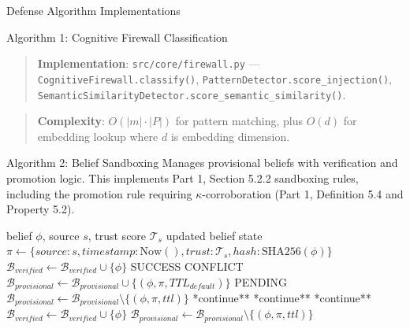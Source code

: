 \documentclass[
  ignorenonframetext,
]{beamer}
\begin{document}
\begin{frame}[fragile]{Defense Algorithm Implementations}
\begin{block}{Algorithm 1: Cognitive Firewall Classification}
\begin{quote}
\textbf{Implementation}: \texttt{src/core/firewall.py} ---
\texttt{CognitiveFirewall.classify()},
\texttt{PatternDetector.score\_injection()},
\texttt{SemanticSimilarityDetector.score\_semantic\_similarity()}.
\end{quote}

\begin{quote}
\textbf{Complexity}: \(O(|m| \cdot |P|)\) for pattern matching, plus
\(O(d)\) for embedding lookup where \(d\) is embedding dimension.
\end{quote}
\end{block}

\begin{block}{Algorithm 2: Belief Sandboxing}
\protect{}\label{sec:alg-sandbox}
Manages provisional beliefs with verification and promotion logic. This
implements Part 1, Section 5.2.2 sandboxing rules, including the
promotion rule requiring \(\kappa\)-corroboration (Part 1, Definition
5.4 and Property 5.2).

\begin{algorithm}
\caption{Belief Sandbox Operations}
\label{alg:sandbox-impl}
\begin{algorithmic}[1]
\Require belief $\phi$, source $s$, trust score $\mathcal{T}_s$
\Ensure updated belief state
  \State $\pi \gets \{source: s, timestamp: \text{Now}(), trust: \mathcal{T}_s, hash: \text{SHA256}(\phi)\}$
      \State $\mathcal{B}_{verified} \gets \mathcal{B}_{verified} \cup \{\phi\}$
      \Return SUCCESS
    \Else
      \Return CONFLICT
    \EndIf
  \Else
    \State $\mathcal{B}_{provisional} \gets \mathcal{B}_{provisional} \cup \{(\phi, \pi, TTL_{default})\}$
    \Return PENDING
  \EndIf
\EndFunction
{}
      \State $\mathcal{B}_{provisional} \gets \mathcal{B}_{provisional} \setminus \{(\phi, \pi, ttl)\}$
      \State **continue**
    \EndIf
      \State **continue**
    \EndIf
      \State **continue**
    \EndIf
      \State $\mathcal{B}_{verified} \gets \mathcal{B}_{verified} \cup \{\phi\}$
      \State $\mathcal{B}_{provisional} \gets \mathcal{B}_{provisional} \setminus \{(\phi, \pi, ttl)\}$
    \EndIf
  \EndFor
\EndFunction
\end{algorithmic}
\end{algorithm}


\end{block}
\end{frame}
\end{document}

